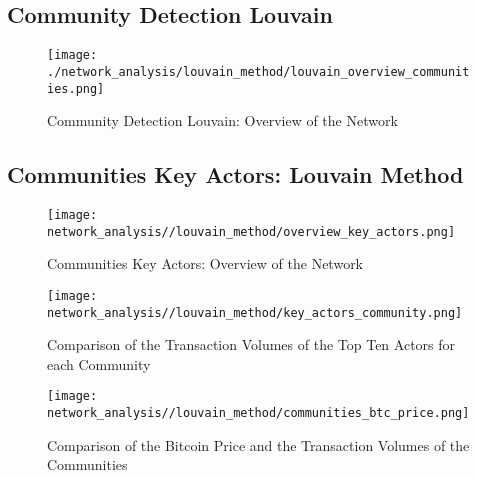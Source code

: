 \documentclass[a4paper, 12pt]{article}
\begin{document}
\subsection{Community Detection Louvain}

\begin{figure}[h]
    \centering
    \texttt{[image: ./network\_analysis/louvain\_method/louvain\_overview\_communities.png]}
    \caption{Community Detection Louvain: Overview of the Network}
    \label{fig:louvain_overview_communities}
\end{figure}

\subsection{Communities Key Actors: Louvain Method}

\begin{figure}[h]
    \centering
    \texttt{[image: network\_analysis//louvain\_method/overview\_key\_actors.png]}
    \caption{Communities Key Actors: Overview of the Network}
    \label{fig:louvain_overview_key_actors}
\end{figure}


\begin{figure}[h]
    \centering
    \texttt{[image: network\_analysis//louvain\_method/key\_actors\_community.png]}
    \caption{Comparison of the Transaction Volumes of the Top Ten Actors for each Community}
    \label{fig:louvain_top_ten_actors_vs_community}
\end{figure}


\begin{figure}[h]
    \centering
    \texttt{[image: network\_analysis//louvain\_method/communities\_btc\_price.png]}
    \caption{Comparison of the Bitcoin Price and the Transaction Volumes of the Communities}
    \label{fig:louvain_communities_btc_price}
\end{figure}
\end{document}

